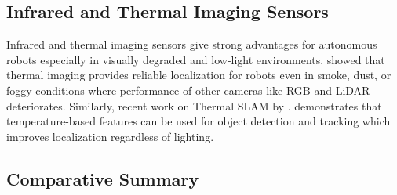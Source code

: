 \subsection{Infrared and Thermal Imaging Sensors}
Infrared and thermal imaging sensors give strong advantages for autonomous robots especially in visually degraded and low-light environments. \cite{Papachristos_Mascarich_Alexis_2018b} showed that thermal imaging provides reliable localization for robots even in smoke, dust, or foggy conditions where performance of other cameras like RGB and LiDAR deteriorates. Similarly, recent work on Thermal SLAM by \cite{Salem2025ThermalSLAM}. demonstrates that temperature-based features can be used for object detection and tracking which improves localization regardless of lighting.

\subsection{Comparative Summary}
